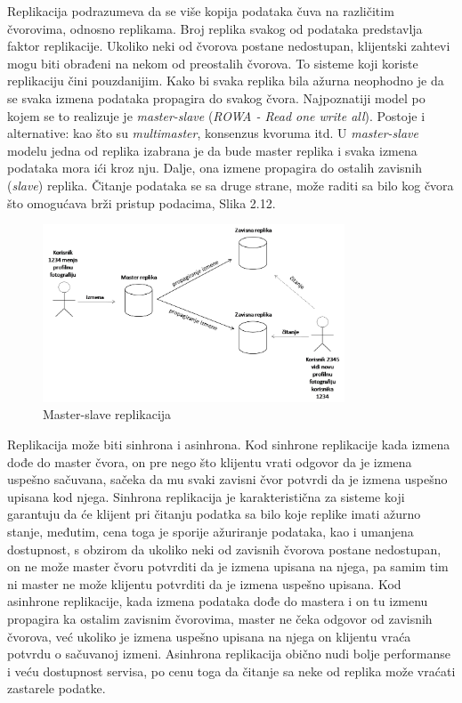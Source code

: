 \documentclass[12pt,oneside]{memoir}
\begin{document}
Replikacija podrazumeva da se više kopija podataka čuva na različitim čvorovima, odnosno replikama. Broj replika svakog od podataka predstavlja faktor replikacije. Ukoliko neki od čvorova postane nedostupan, klijentski zahtevi mogu biti obrađeni na nekom od preostalih čvorova. To sisteme koji koriste replikaciju čini pouzdanijim. Kako bi svaka replika bila ažurna neophodno je da se svaka izmena podataka propagira do svakog čvora. Najpoznatiji model po kojem se to realizuje je \textit{master-slave} (\textit{ROWA - Read one write all}\cite{rowa}). Postoje i alternative: kao što su \textit{multimaster}, konsenzus kvoruma itd. U \textit{master-slave} modelu jedna od replika izabrana je da bude master replika i svaka izmena podataka mora ići kroz nju. Dalje, ona izmene propagira do ostalih zavisnih (\textit{slave}) replika. Čitanje podataka se sa druge strane, može 
raditi sa bilo kog čvora što omogućava brži pristup podacima, Slika 2.12.

\begin{figure}[!ht]
  \centering
  \includegraphics[width=0.8\textwidth]{master-slave.png}
  \caption{Master-slave replikacija}
  \label{fig:grafikon}
\end{figure}


Replikacija može biti sinhrona i asinhrona. Kod sinhrone replikacije kada izmena dođe do master čvora, on pre nego što klijentu vrati odgovor da je izmena uspešno sačuvana, sačeka da mu svaki zavisni čvor potvrdi da je izmena uspešno upisana kod njega. Sinhrona replikacija je karakteristična za sisteme koji garantuju da će klijent pri čitanju podatka sa bilo koje replike imati ažurno stanje, međutim, cena toga je sporije ažuriranje podataka, kao i umanjena dostupnost, s obzirom da ukoliko neki od zavisnih čvorova postane nedostupan, on ne može master čvoru potvrditi da je izmena upisana na njega, pa samim tim ni master ne može klijentu potvrditi da je izmena uspešno upisana. Kod asinhrone replikacije, kada izmena podataka dođe do mastera i on tu izmenu propagira ka ostalim zavisnim čvorovima, master ne čeka odgovor od zavisnih čvorova, već ukoliko je izmena uspešno upisana na njega on klijentu vraća potvrdu o sačuvanoj izmeni. Asinhrona replikacija obično nudi bolje performanse i veću dostupnost servisa, po cenu toga da čitanje sa neke od replika može vraćati zastarele podatke.
\end{document}
